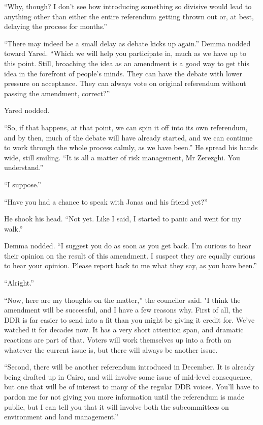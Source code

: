 ``Why, though? I don't see how introducing something so divisive would lead to anything other than either the entire referendum getting thrown out or, at best, delaying the process for months.''

``There may indeed be a small delay as debate kicks up again.'' Demma nodded toward Yared. ``Which we will help you participate in, much as we have up to this point. Still, broaching the idea as an amendment is a good way to get this idea in the forefront of people's minds. They can have the debate with lower pressure on acceptance. They can always vote on original referendum without passing the amendment, correct?''

Yared nodded.

``So, if that happens, at that point, we can spin it off into its own referendum, and by then, much of the debate will have already started, and we can continue to work through the whole process calmly, as we have been.'' He spread his hands wide, still smiling. ``It is all a matter of risk management, Mr Zerezghi. You understand.''

``I suppose.''

``Have you had a chance to speak with Jonas and his friend yet?''

He shook his head. ``Not yet. Like I said, I started to panic and went for my walk.''

Demma nodded. ``I suggest you do as soon as you get back. I'm curious to hear their opinion on the result of this amendment. I suspect they are equally curious to hear your opinion. Please report back to me what they say, as you have been.''

``Alright.''

``Now, here are my thoughts on the matter,'' the councilor said. "I think the amendment will be successful, and I have a few reasons why. First of all, the DDR is far easier to send into a fit than you might be giving it credit for. We've watched it for decades now. It has a very short attention span, and dramatic reactions are part of that. Voters will work themselves up into a froth on whatever the current issue is, but there will always be another issue.

``Second, there will be another referendum introduced in December. It is already being drafted up in Cairo, and will involve some issue of mid-level consequence, but one that will be of interest to many of the regular DDR voices. You'll have to pardon me for not giving you more information until the referendum is made public, but I can tell you that it will involve both the subcommittees on environment and land management.''

